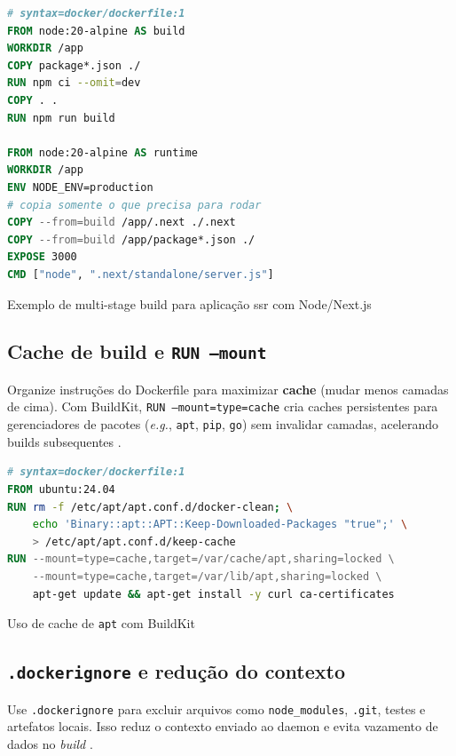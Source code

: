 \begin{codigo}[H]
\begin{lstlisting}[language=Dockerfile]
# syntax=docker/dockerfile:1
FROM node:20-alpine AS build
WORKDIR /app
COPY package*.json ./
RUN npm ci --omit=dev
COPY . .
RUN npm run build

FROM node:20-alpine AS runtime
WORKDIR /app
ENV NODE_ENV=production
# copia somente o que precisa para rodar
COPY --from=build /app/.next ./.next
COPY --from=build /app/package*.json ./
EXPOSE 3000
CMD ["node", ".next/standalone/server.js"]
\end{lstlisting}
\caption{Exemplo de multi-stage build para aplicação \acrshort{ssr} com Node/Next.js}
\label{lst:dockerfile-multistage}
\end{codigo}

\subsection{Cache de build e \texttt{RUN --mount}}
\label{subsec:cache-build}

Organize instruções do Dockerfile para maximizar \textbf{cache} (mudar menos camadas de cima). Com BuildKit, \texttt{RUN --mount=type=cache} cria caches persistentes para gerenciadores de pacotes (\textit{e.g.}, \texttt{apt}, \texttt{pip}, \texttt{go}) sem invalidar camadas, acelerando builds subsequentes \cite{dockerfile_ref}. 

\begin{codigo}[H]
\begin{lstlisting}[language=Dockerfile]
# syntax=docker/dockerfile:1
FROM ubuntu:24.04
RUN rm -f /etc/apt/apt.conf.d/docker-clean; \
    echo 'Binary::apt::APT::Keep-Downloaded-Packages "true";' \
    > /etc/apt/apt.conf.d/keep-cache
RUN --mount=type=cache,target=/var/cache/apt,sharing=locked \
    --mount=type=cache,target=/var/lib/apt,sharing=locked \
    apt-get update && apt-get install -y curl ca-certificates
\end{lstlisting}
\caption{Uso de cache de \texttt{apt} com BuildKit}
\label{lst:dockerfile-cache}
\end{codigo}

\subsection{\texttt{.dockerignore} e redução do contexto}
\label{subsec:dockerignore}

Use \texttt{.dockerignore} para excluir arquivos como \texttt{node\_modules}, \texttt{.git}, testes e artefatos locais. Isso reduz o contexto enviado ao daemon e evita vazamento de dados no \textit{build} \cite{dockerfile_ref}. 

